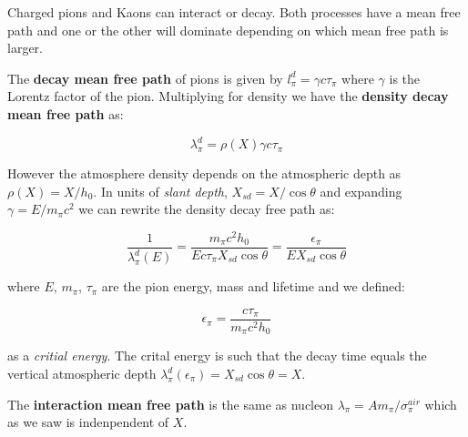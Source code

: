 \documentclass[
  letterpaper,
  DIV=11,
  numbers=noendperiod]{scrreprt}
\begin{document}
\begin{tcolorbox}[enhanced jigsaw, colframe=quarto-callout-note-color-frame, opacitybacktitle=0.6, left=2mm, leftrule=.75mm, opacityback=0, colbacktitle=quarto-callout-note-color!10!white, breakable, bottomrule=.15mm, toprule=.15mm, colback=white, coltitle=black, bottomtitle=1mm, toptitle=1mm, titlerule=0mm, title=\textcolor{quarto-callout-note-color}{\faInfo}\hspace{0.5em}{Mean free path for mesons, \(\pi\), \(K\)}, arc=.35mm, rightrule=.15mm]

Charged pions and Kaons can interact or decay. Both processes have a
mean free path and one or the other will dominate depending on which
mean free path is larger.

The \textbf{decay mean free path} of pions is given by
\(l^d_\pi =\gamma  c \tau_\pi\) where \(\gamma\) is the Lorentz factor
of the pion. Multiplying for density we have the \textbf{density decay
mean free path} as:

\[\lambda^d_\pi = \rho(X) \gamma  c \tau_\pi\]

However the atmosphere density depends on the atmospheric depth as
\(\rho(X) = X/h_0\). In units of \emph{slant depth},
\(X_{sd} = X/\cos\theta\) and expanding \(\gamma = E / m_\pi c^2\) we
can rewrite the density decay free path as:

\[\frac{1}{\lambda^d_\pi(E)} = \frac{m_\pi c^2 h_0}{E c \tau_\pi X_{sd} \cos \theta} = \frac{\epsilon_\pi}{E X_{sd} \cos\theta}\]

where \(E\), \(m_\pi\), \(\tau_\pi\) are the pion energy, mass and
lifetime and we defined:

\[\epsilon_\pi = \frac{c\tau_\pi}{m_\pi c^2 h_0}\]

as a \emph{critial energy}. The crital energy is such that the decay
time equals the vertical atmospheric depth
\(\lambda^d_\pi(\epsilon_\pi) = X_{sd} \cos\theta = X\).

The \textbf{interaction mean free path} is the same as nucleon
\(\lambda_\pi = A m_\pi/\sigma_\pi^{air}\) which as we saw is
indenpendent of \(X\).

\end{tcolorbox}
\end{document}
